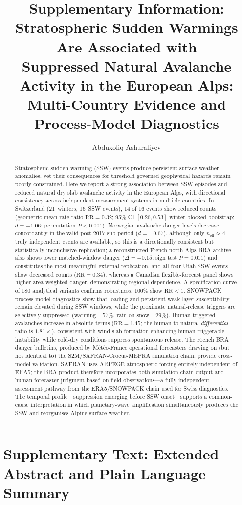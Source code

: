 \documentclass[11pt,letterpaper]{article}
\title{Supplementary Information:\\
Stratospheric Sudden Warmings Are Associated with\\
Suppressed Natural Avalanche Activity in the European Alps:\\
Multi-Country Evidence and Process-Model Diagnostics}
\author{Abduxoliq Ashuraliyev}
\date{}
\begin{document}
\maketitle

\tableofcontents

\section*{Supplementary Text: Extended Abstract and Plain Language Summary}
\begin{abstract}
Stratospheric sudden warming (SSW) events produce persistent surface weather anomalies, yet their consequences for threshold-governed geophysical hazards remain poorly constrained.
Here we report a strong association between SSW episodes and reduced natural dry slab avalanche activity in the European Alps, with directional consistency across independent measurement systems in multiple countries.
In Switzerland (21~winters, 16~SSW events), 14 of 16 events show reduced counts (geometric mean rate ratio $\mathrm{RR} = 0.32$; 95\% CI $[0.26, 0.53]$ winter-blocked bootstrap; $d = -1.06$; permutation $P < 0.001$).
Norwegian avalanche danger levels decrease concordantly in the valid post-2017 sub-period ($d = -0.67$), although only $n_{\mathrm{eff}} \approx 4$ truly independent events are available, so this is a directionally consistent but statistically inconclusive replication; a reconstructed French north-Alps BRA archive also shows lower matched-window danger ($\Delta = -0.15$; sign test $P = 0.011$) and constitutes the most meaningful external replication, and all four Utah SSW events show decreased counts ($\mathrm{RR} = 0.34$), whereas a Canadian flexible-forecast panel shows higher area-weighted danger, demonstrating regional dependence.
A specification curve of 180 analytical variants confirms robustness: 100\% show $\mathrm{RR} < 1$.
SNOWPACK process-model diagnostics show that loading and persistent-weak-layer susceptibility remain elevated during SSW windows, while the proximate natural-release triggers are selectively suppressed (warming $-57\%$, rain-on-snow $-29\%$). Human-triggered avalanches increase in absolute terms ($\mathrm{RR} = 1.45$; the human-to-natural \emph{differential} ratio is $1.81\times$), consistent with wind-slab formation enhancing human-triggerable instability while cold-dry conditions suppress spontaneous release.
The French BRA danger bulletins, produced by M\'et\'eo-France operational forecasters drawing on (but not identical to) the S2M/SAFRAN-Crocus-MEPRA simulation chain, provide cross-model validation. SAFRAN uses ARPEGE atmospheric forcing entirely independent of ERA5; the BRA product therefore incorporates both simulation-chain output and human forecaster judgment based on field observations---a fully independent assessment pathway from the ERA5/SNOWPACK chain used for Swiss diagnostics.
The temporal profile---suppression emerging before SSW onset---supports a common-cause interpretation in which planetary-wave amplification simultaneously produces the SSW and reorganises Alpine surface weather.
\end{abstract}
\end{document}
